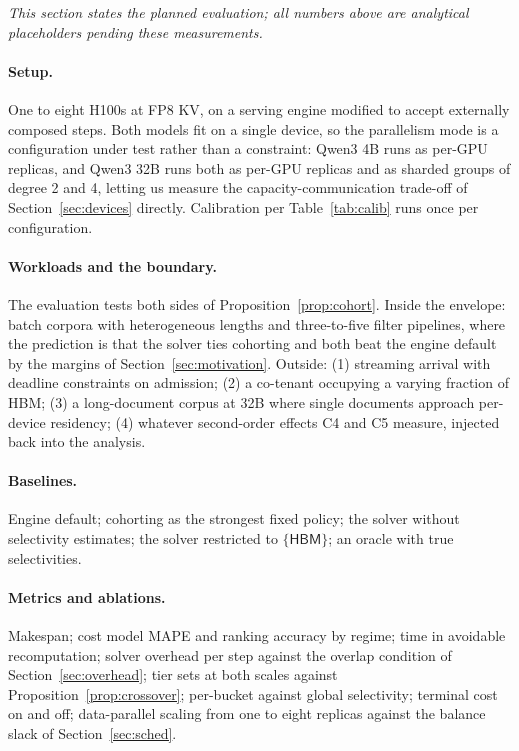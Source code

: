 \documentclass[10pt,twocolumn]{article}
\newcommand{\hbm}{\mathsf{HBM}}
\begin{document}
\emph{This section states the planned evaluation; all numbers above are analytical placeholders pending these measurements.}

\paragraph{Setup.} One to eight H100s at FP8 KV, on a serving engine modified to accept externally composed steps. Both models fit on a single device, so the parallelism mode is a configuration under test rather than a constraint: Qwen3 4B runs as per-GPU replicas, and Qwen3 32B runs both as per-GPU replicas and as sharded groups of degree 2 and 4, letting us measure the capacity-communication trade-off of Section~\ref{sec:devices} directly. Calibration per Table~\ref{tab:calib} runs once per configuration.

\paragraph{Workloads and the boundary.} The evaluation tests both sides of Proposition~\ref{prop:cohort}. Inside the envelope: batch corpora with heterogeneous lengths and three-to-five filter pipelines, where the prediction is that the solver ties cohorting and both beat the engine default by the margins of Section~\ref{sec:motivation}. Outside: (1) streaming arrival with deadline constraints on admission; (2) a co-tenant occupying a varying fraction of HBM; (3) a long-document corpus at 32B where single documents approach per-device residency; (4) whatever second-order effects C4 and C5 measure, injected back into the analysis.

\paragraph{Baselines.} Engine default; cohorting as the strongest fixed policy; the solver without selectivity estimates; the solver restricted to $\{\hbm\}$; an oracle with true selectivities.

\paragraph{Metrics and ablations.} Makespan; cost model MAPE and ranking accuracy by regime; time in avoidable recomputation; solver overhead per step against the overlap condition of Section~\ref{sec:overhead}; tier sets at both scales against Proposition~\ref{prop:crossover}; per-bucket against global selectivity; terminal cost on and off; data-parallel scaling from one to eight replicas against the balance slack of Section~\ref{sec:sched}.
\end{document}
